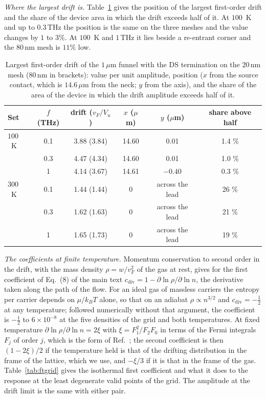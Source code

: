 \documentclass[aps,prapplied,onecolumn,superscriptaddress,floatfix]{revtex4-2}
\newcommand{\um}{\,\mu\mathrm{m}}
\newcommand{\nm}{\,\mathrm{nm}}
\newcommand{\THz}{\,\mathrm{THz}}
\begin{document}
\emph{Where the largest drift is.} Table~\ref{tab:driftpos} gives the
position of the largest first-order drift and the share of the device
area in which the drift exceeds half of it. At $100$~K and up to
$0.3\THz$ the position is the same on the three meshes and the value
changes by $1$ to $3\%$. At $100$~K and $1\THz$ it lies beside a
re-entrant corner and the $80\nm$ mesh is $11\%$ low.

\begin{table}[ht]
\caption{\label{tab:driftpos}Largest first-order drift of the $1\um$
funnel with the DS termination on the $20\nm$ mesh ($80\nm$ in
brackets): value per unit amplitude, position ($x$ from the source
contact, which is $14.6\um$ from the neck; $y$ from the axis), and the
share of the area of the device in which the drift amplitude exceeds
half of it.}
\begin{ruledtabular}
\begin{tabular}{lccccc}
Set & $f$ (THz) & drift ($v_{F}/V_{u}$) & $x$ ($\mu$m) & $y$ ($\mu$m) & share above half \\
\hline
$100$~K & 0.1 & 3.88 (3.84) & 14.60 & 0.01 & 1.4 \% \\
 & 0.3 & 4.47 (4.34) & 14.60 & 0.01 & 1.0 \% \\
 & 1 & 4.14 (3.67) & 14.61 & $-0.40$ & 0.3 \% \\
$300$~K & 0.1 & 1.44 (1.44) & 0 & across the lead & 26 \% \\
 & 0.3 & 1.62 (1.63) & 0 & across the lead & 21 \% \\
 & 1 & 1.65 (1.73) & 0 & across the lead & 19 \% \\
\end{tabular}
\end{ruledtabular}
\end{table}

\emph{The coefficients at finite temperature.} Momentum conservation to
second order in the drift, with the mass density $\rho=w/v_{F}^{2}$ of
the gas at rest, gives for the first coefficient of Eq.~(8) of the main
text $c_{\mathrm{div}}=1-\partial\ln\rho/\partial\ln n$, the derivative
taken along the path of the flow. For an ideal gas of massless carriers
the entropy per carrier depends on $\mu/k_{B}T$ alone, so that on an
adiabat $\rho\propto n^{3/2}$ and $c_{\mathrm{div}}=-\tfrac12$ at any
temperature; followed numerically without that argument, the coefficient
is $-\tfrac12$ to $6\times10^{-8}$ at the five densities of the grid and
both temperatures. At fixed temperature
$\partial\ln\rho/\partial\ln n=2\xi$ with $\xi=F_{1}^{2}/F_{2}F_{0}$ in
terms of the Fermi integrals $F_{j}$ of order $j$, which is the form of
Ref.~\cite{svintsov2013hydrodynamic}; the second coefficient is then
$(1-2\xi)/2$ if the temperature held is that of the drifting
distribution in the frame of the lattice, which we use, and $-\xi/3$ if
it is that in the frame of the gas. Table~\ref{tab:ftgrid} gives the
isothermal first coefficient and what it does to the response at the
least degenerate valid points of the grid. The amplitude at the drift
limit is the same with either pair.
\end{document}
